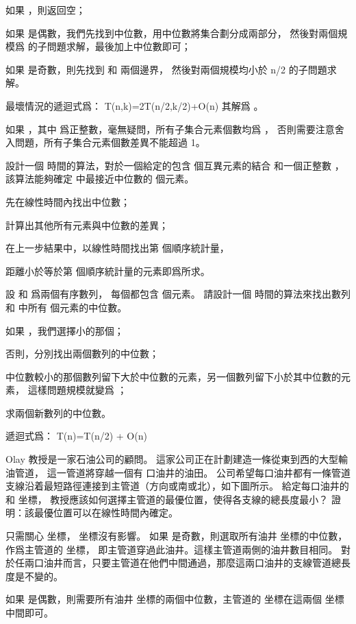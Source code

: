 \startANSWER
\startigNum
\item 如果 ，則返回空；
\item 如果  是偶數，我們先找到中位數，用中位數將集合劃分成兩部分，
然後對兩個規模爲  的子問題求解，最後加上中位數即可；
\item 如果  是奇數，則先找到  和  兩個邊界，
然後對兩個規模均小於 n/2 的子問題求解。
\stopigNum

最壞情況的遞迴式爲：
\startformula
T(n,k)=2T(\lfloor n/2\rfloor,k/2)+O(n)
\stopformula
其解爲 。

如果 ，其中  爲正整數，毫無疑問，所有子集合元素個數均爲 ，
否則需要注意舍入問題，所有子集合元素個數差異不能超過 1。
\stopANSWER

\startEXERCISE
設計一個  時間的算法，對於一個給定的包含  個互異元素的結合  和一個正整數 ，
該算法能夠確定  中最接近中位數的  個元素。
\stopEXERCISE

\startANSWER
\startigNum
\item 先在線性時間內找出中位數；
\item 計算出其他所有元素與中位數的差異；
\item 在上一步結果中，以線性時間找出第  個順序統計量，
\item 距離小於等於第  個順序統計量的元素即爲所求。
\stopigNum
\stopANSWER

\startEXERCISE[exercise:9.3-8]
設  和  爲兩個有序數列，
每個都包含  個元素。
請設計一個  時間的算法來找出數列  和  中所有  個元素的中位數。
\stopEXERCISE

\startANSWER
\startigNum
\item 如果 ，我們選擇小的那個；
\item 否則，分別找出兩個數列的中位數；
\item 中位數較小的那個數列留下大於中位數的元素，另一個數列留下小於其中位數的元素，
這樣問題規模就變爲 ；
\item 求兩個新數列的中位數。
\stopigNum

遞迴式爲：
\startformula
T(n)=T(n/2) + O(n)
\stopformula
\stopANSWER

Olay 教授是一家石油公司的顧問。
這家公司正在計劃建造一條從東到西的大型輸油管道，
這一管道將穿越一個有  口油井的油田。
公司希望每口油井都有一條管道支線沿着最短路徑連接到主管道（方向或南或北），如下圖所示。
給定每口油井的  和  坐標，
教授應該如何選擇主管道的最優位置，使得各支線的總長度最小？
證明：該最優位置可以在線性時間內確定。

\externalfigure[output/e9_3_9-1]
\stopEXERCISE

\startANSWER
只需關心  坐標，  坐標沒有影響。
如果  是奇數，則選取所有油井  坐標的中位數，作爲主管道的  坐標，
即主管道穿過此油井。這樣主管道兩側的油井數目相同。
對於任兩口油井而言，只要主管道在他們中間通過，那麼這兩口油井的支線管道總長度是不變的。

如果  是偶數，則需要所有油井  坐標的兩個中位數，主管道的  坐標在這兩個  坐標中間即可。
\stopANSWER

\stopsection
